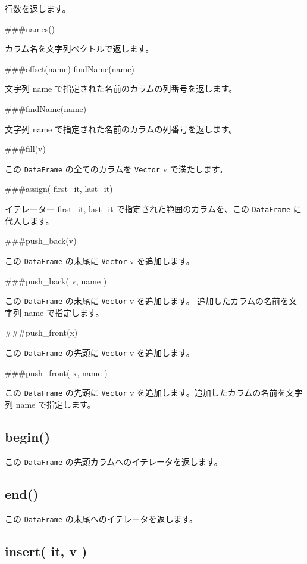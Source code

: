 \documentclass[]{book}
\begin{document}
行数を返します。

\#\#\#names()

カラム名を文字列ベクトルで返します。

\#\#\#offset(name) findName(name)

文字列 name で指定された名前のカラムの列番号を返します。

\#\#\#findName(name)

文字列 name で指定された名前のカラムの列番号を返します。

\#\#\#fill(v)

この \texttt{DataFrame} の全てのカラムを \texttt{Vector} v で満たします。

\#\#\#assign( first\_it, last\_it)

イテレーター first\_it, last\_it で指定された範囲のカラムを、この \texttt{DataFrame} に代入します。

\#\#\#push\_back(v)

この \texttt{DataFrame} の末尾に \texttt{Vector} v を追加します。

\#\#\#push\_back( v, name )

この \texttt{DataFrame} の末尾に \texttt{Vector} v を追加します。 追加したカラムの名前を文字列 name で指定します。

\#\#\#push\_front(x)

この \texttt{DataFrame} の先頭に \texttt{Vector} v を追加します。

\#\#\#push\_front( x, name )

この \texttt{DataFrame} の先頭に \texttt{Vector} v を追加します。追加したカラムの名前を文字列 name で指定します。

\hypertarget{begin-1}{%
\subsection{begin()}\label{begin-1}}

この \texttt{DataFrame} の先頭カラムへのイテレータを返します。

\hypertarget{end-1}{%
\subsection{end()}\label{end-1}}

この \texttt{DataFrame} の末尾へのイテレータを返します。

\hypertarget{insert-it-v}{%
\subsection{insert( it, v )}\label{insert-it-v}}
\end{document}
